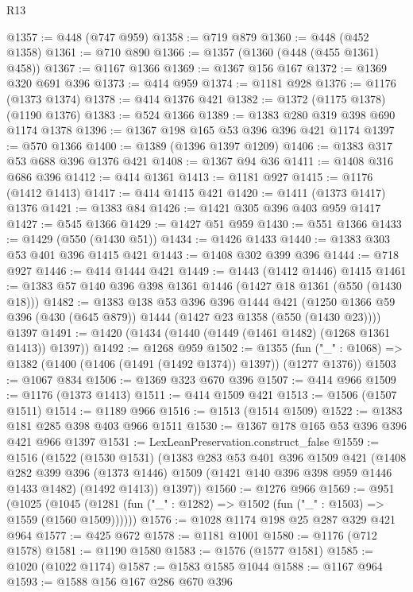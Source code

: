 \begin{lexlean}{R13}
\begin{coremodule}
@1357 := @448 (@747 @959)
@1358 := @719 @879
@1360 := @448 (@452 @1358)
@1361 := @710 @890
@1366 := @1357 (@1360 (@448 (@455 @1361) @458))
@1367 := @1167 @1366
@1369 := @1367 @156 @167
@1372 := @1369 @320 @691 @396
@1373 := @414 @959
@1374 := @1181 @928
@1376 := @1176 (@1373 @1374)
@1378 := @414 @1376 @421
@1382 := @1372 (@1175 @1378) (@1190 @1376)
@1383 := @524 @1366
@1389 := @1383 @280 @319 @398 @690 @1174 @1378
@1396 := @1367 @198 @165 @53 @396 @396 @421 @1174
@1397 := @570 @1366
@1400 := @1389 (@1396 @1397 @1209)
@1406 := @1383 @317 @53 @688 @396 @1376 @421
@1408 := @1367 @94 @36
@1411 := @1408 @316 @686 @396
@1412 := @414 @1361
@1413 := @1181 @927
@1415 := @1176 (@1412 @1413)
@1417 := @414 @1415 @421
@1420 := @1411 (@1373 @1417) @1376
@1421 := @1383 @84
@1426 := @1421 @305 @396 @403 @959 @1417
@1427 := @545 @1366
@1429 := @1427 @51 @959
@1430 := @551 @1366
@1433 := @1429 (@550 (@1430 @51))
@1434 := @1426 @1433
@1440 := @1383 @303 @53 @401 @396 @1415 @421
@1443 := @1408 @302 @399 @396
@1444 := @718 @927
@1446 := @414 @1444 @421
@1449 := @1443 (@1412 @1446) @1415
@1461 := @1383 @57 @140 @396 @398 @1361 @1446 (@1427 @18 @1361 (@550 (@1430 @18)))
@1482 := @1383
    @138
    @53
    @396
    @396
    @1444
    @421
    (@1250 @1366 @59 @396 (@430 (@645 @879)) @1444 (@1427 @23 @1358 (@550 (@1430 @23))))
    @1397
@1491 := @1420 (@1434 (@1440 (@1449 (@1461 @1482) (@1268 @1361 @1413)) @1397))
@1492 := @1268 @959
@1502 := @1355
    (fun ("_" : @1068) => @1382 (@1400 (@1406 (@1491 (@1492 @1374)) @1397)) (@1277 @1376))
@1503 := @1067 @834
@1506 := @1369 @323 @670 @396
@1507 := @414 @966
@1509 := @1176 (@1373 @1413)
@1511 := @414 @1509 @421
@1513 := @1506 (@1507 @1511)
@1514 := @1189 @966
@1516 := @1513 (@1514 @1509)
@1522 := @1383 @181 @285 @398 @403 @966 @1511
@1530 := @1367 @178 @165 @53 @396 @396 @421 @966 @1397
@1531 := LexLeanPreservation.construct_false
@1559 := @1516
    (@1522
      (@1530 @1531)
      (@1383
        @283
        @53
        @401
        @396
        @1509
        @421
        (@1408
          @282
          @399
          @396
          (@1373 @1446)
          @1509
          (@1421 @140 @396 @398 @959 @1446 @1433 @1482)
          (@1492 @1413))
        @1397))
@1560 := @1276 @966
@1569 := @951
    (@1025 (@1045 (@1281 (fun ("_" : @1282) => @1502 (fun ("_" : @1503) => @1559 (@1560 @1509))))))
@1576 := @1028 @1174 @198 @25 @287 @329 @421 @964
@1577 := @425 @672
@1578 := @1181 @1001
@1580 := @1176 (@712 @1578)
@1581 := @1190 @1580
@1583 := @1576 (@1577 @1581)
@1585 := @1020 (@1022 @1174)
@1587 := @1583 @1585 @1044
@1588 := @1167 @964
@1593 := @1588 @156 @167 @286 @670 @396

\end{coremodule}
\end{lexlean}
